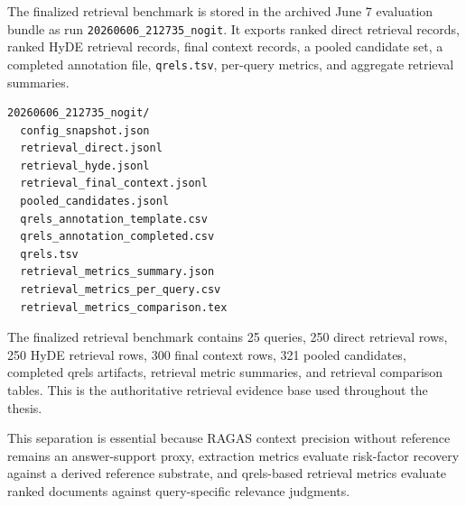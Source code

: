 The finalized retrieval benchmark is stored in the archived June 7 evaluation bundle as run \texttt{20260606\_212735\_nogit}. It exports ranked direct retrieval records, ranked HyDE retrieval records, final context records, a pooled candidate set, a completed annotation file, \texttt{qrels.tsv}, per-query metrics, and aggregate retrieval summaries.

\begin{lstlisting}[language={},caption={Finalized retrieval benchmark artifacts.}]
20260606_212735_nogit/
  config_snapshot.json
  retrieval_direct.jsonl
  retrieval_hyde.jsonl
  retrieval_final_context.jsonl
  pooled_candidates.jsonl
  qrels_annotation_template.csv
  qrels_annotation_completed.csv
  qrels.tsv
  retrieval_metrics_summary.json
  retrieval_metrics_per_query.csv
  retrieval_metrics_comparison.tex
\end{lstlisting}

The finalized retrieval benchmark contains 25 queries, 250 direct retrieval rows, 250 HyDE retrieval rows, 300 final context rows, 321 pooled candidates, completed qrels artifacts, retrieval metric summaries, and retrieval comparison tables. This is the authoritative retrieval evidence base used throughout the thesis.

This separation is essential because RAGAS context precision without reference remains an answer-support proxy, extraction metrics evaluate risk-factor recovery against a derived reference substrate, and qrels-based retrieval metrics evaluate ranked documents against query-specific relevance judgments.

